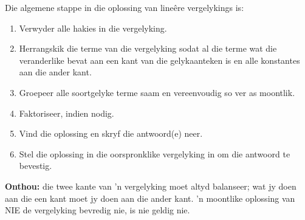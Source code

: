 Die algemene stappe in die oplossing van lineêre vergelykings is:
\begin{enumerate}[noitemsep, label=\textbf{\arabic*}. ] 
    \item Verwyder alle hakies in die vergelyking.
    \item Herrangskik die terme van die vergelyking sodat al die terme wat die veranderlike bevat aan een kant van die gelykaanteken is en alle konstantes aan die ander kant.
    \item Groepeer alle soortgelyke terme saam en vereenvoudig so ver as moontlik.
\item Faktoriseer, indien nodig.
    \item Vind die oplossing en skryf die antwoord(e) neer.
    \item Stel die oplossing in die oorspronklike vergelyking in om die antwoord te bevestig.
\end{enumerate}

\textbf{Onthou: } die twee kante van 'n vergelyking moet altyd balanseer; wat jy doen aan die een kant moet jy doen aan die ander kant. 'n moontlike oplossing van NIE de vergelyking bevredig nie, is nie geldig nie.

    
% 
% 	    
% 
% 	    
% 
% 	    
% 

